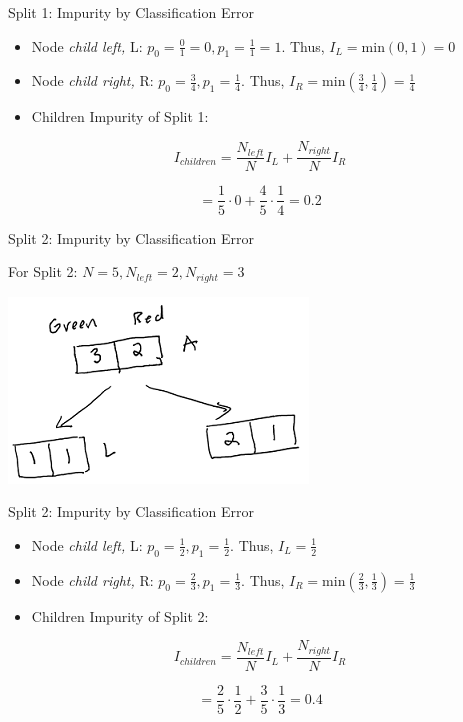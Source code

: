 \documentclass[
  ignorenonframetext,
]{beamer}
\begin{document}
\begin{frame}{Split 1: Impurity by Classification Error}
\protect\hypertarget{split-1-impurity-by-classification-error-1}{}

\begin{itemize}
\item
  Node \emph{child left,} L:
  \(p_0 = \frac{0}{1} = 0, p_1 = \frac{1}{1} = 1\). Thus,
  \(I_{L} = \text{min}(0, 1) = 0\)
\item
  Node \emph{child right,} R: \(p_0 = \frac{3}{4}, p_1 = \frac{1}{4}\).
  Thus, \(I_{R} = \text{min}(\frac{3}{4}, \frac{1}{4}) = \frac{1}{4}\)
\item
  Children Impurity of Split 1:
\end{itemize}

\[
I_{children} = \frac{N_{left}}{N}I_{L} + \frac{N_{right}}{N}I_{R}
\]

\[     = \frac{1}{5} \cdot 0 + \frac{4}{5} \cdot \frac{1}{4} = 0.2\]

\end{frame}

\begin{frame}{Split 2: Impurity by Classification Error}
\protect\hypertarget{split-2-impurity-by-classification-error}{}

For Split 2: \(N = 5, N_{left} =2, N_{right} = 3\)

\includegraphics{images2/im3.png}

\end{frame}

\begin{frame}{Split 2: Impurity by Classification Error}
\protect\hypertarget{split-2-impurity-by-classification-error-1}{}

\begin{itemize}
\item
  Node \emph{child left,} L: \(p_0 = \frac{1}{2}, p_1 = \frac{1}{2}\).
  Thus, \(I_{L} = \frac{1}{2}\)
\item
  Node \emph{child right,} R: \(p_0 = \frac{2}{3}, p_1 = \frac{1}{3}\).
  Thus, \(I_{R} = \text{min}(\frac{2}{3}, \frac{1}{3}) = \frac{1}{3}\)
\item
  Children Impurity of Split 2:
\end{itemize}

\[
I_{children} = \frac{N_{left}}{N}I_{L} + \frac{N_{right}}{N}I_{R}
\]

\[ = \frac{2}{5} \cdot \frac{1}{2} + \frac{3}{5} \cdot \frac{1}{3} = 0.4\]

\end{frame}
\end{document}
